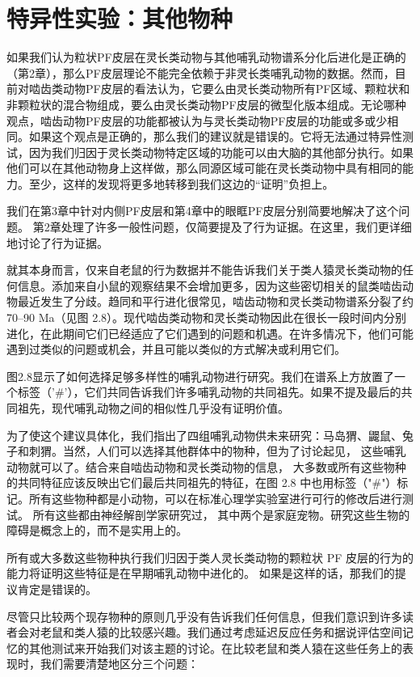 \section{特异性实验：其他物种}
如果我们认为粒状PF皮层在灵长类动物与其他哺乳动物谱系分化后进化是正确的（第2章），那么PF皮层理论不能完全依赖于非灵长类哺乳动物的数据。然而，目前对啮齿类动物PF皮层的看法认为，它要么由灵长类动物所有PF区域、颗粒状和非颗粒状的混合物组成，要么由灵长类动物PF皮层的微型化版本组成。无论哪种观点，啮齿动物PF皮层的功能都被认为与灵长类动物PF皮层的功能或多或少相同。如果这个观点是正确的，那么我们的建议就是错误的。它将无法通过特异性测试，因为我们归因于灵长类动物特定区域的功能可以由大脑的其他部分执行。如果他们可以在其他动物身上这样做，那么同源区域可能在灵长类动物中具有相同的能力。至少，这样的发现将更多地转移到我们这边的“证明”负担上。
\par 
我们在第3章中针对内侧PF皮层和第4章中的眼眶PF皮层分别简要地解决了这个问题。 
第2章处理了许多一般性问题，仅简要提及了行为证据。在这里，我们更详细地讨论了行为证据。
\par 
就其本身而言，仅来自老鼠的行为数据并不能告诉我们关于类人猿灵长类动物的任何信息。添加来自小鼠的观察结果不会增加更多，因为这些密切相关的鼠类啮齿动物最近发生了分歧。趋同和平行进化很常见，啮齿动物和灵长类动物谱系分裂了约 70–90 Ma（见图 2.8）。现代啮齿类动物和灵长类动物因此在很长一段时间内分别进化，在此期间它们已经适应了它们遇到的问题和机遇。在许多情况下，他们可能遇到过类似的问题或机会，并且可能以类似的方式解决或利用它们。
\par 
图2.8显示了如何选择足够多样性的哺乳动物进行研究。我们在谱系上方放置了一个标签（'$\#$'），它们共同告诉我们许多哺乳动物的共同祖先。如果不提及最后的共同祖先，现代哺乳动物之间的相似性几乎没有证明价值。
\par 
为了使这个建议具体化，我们指出了四组哺乳动物供未来研究：马岛猬、鼹鼠、兔子和刺猬。当然，人们可以选择其他群体中的物种，但为了讨论起见， 这些哺乳动物就可以了。结合来自啮齿动物和灵长类动物的信息， 大多数或所有这些物种的共同特征应该反映出它们最后共同祖先的特征，在图 2.8 中也用标签（"$\#$"）标记。所有这些物种都是小动物，可以在标准心理学实验室进行可行的修改后进行测试。 所有这些都由神经解剖学家研究过， 其中两个是家庭宠物。研究这些生物的障碍是概念上的，而不是实用上的。
\par 
所有或大多数这些物种执行我们归因于类人灵长类动物的颗粒状 PF 皮层的行为的能力将证明这些特征是在早期哺乳动物中进化的。 
如果是这样的话，那我们的提议肯定是错误的。
\par 
尽管只比较两个现存物种的原则几乎没有告诉我们任何信息，但我们意识到许多读者会对老鼠和类人猿的比较感兴趣。我们通过考虑延迟反应任务和据说评估空间记忆的其他测试来开始我们对该主题的讨论。在比较老鼠和类人猿在这些任务上的表现时，我们需要清楚地区分三个问题：
